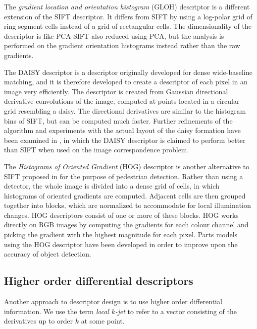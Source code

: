 \documentclass[thesis.tex]{subfiles}
\begin{document}
The \emph{gradient location and orientation histogram} (GLOH) descriptor \cite{mikolajczyk2005performance} is a different extension of the SIFT descriptor. It differs from SIFT by using a log-polar grid of ring segment cells instead of a grid of rectangular cells. The dimensionality of the descriptor is like PCA-SIFT also reduced using PCA, but the analysis is performed on the gradient orientation histograms instead rather than the raw gradients.

The DAISY descriptor \cite{tola2008fast} is a descriptor originally developed for dense wide-baseline matching, and it is therefore developed to create a descriptor of each pixel in an image very efficiently. The descriptor is created from Gaussian directional derivative convolutions of the image, computed at points located in a circular grid resembling a daisy. The directional derivatives are similar to the histogram bins of SIFT, but can be computed much faster. Further refinements of the algorithm and experiments with the actual layout of the daisy formation have been examined in \cite{winder2009picking}, in which the DAISY descriptor is claimed to perform better than SIFT when used on the image correspondence problem.

The \emph{Histograms of Oriented Gradient} (HOG) descriptor is another alternative to SIFT proposed in \cite{dalal2005histograms} for the purpose of pedestrian detection. Rather than using a detector, the whole image is divided into a dense grid of cells, in which histograms of oriented gradients are computed. Adjacent cells are then grouped together into blocks, which are normalized to accommodate for local illumination changes. HOG descriptors consist of one or more of these blocks. HOG works directly on RGB images by computing the gradients for each colour channel and picking the gradient with the highest magnitude for each pixel. Parts models using the HOG descriptor have been developed \cite{felzenszwalb2008discriminatively} in order to improve upon the accuracy of object detection.

\subsection{Higher order differential descriptors}

Another approach to descriptor design is to use higher order differential information. We use the term \emph{local $k$-jet} to refer to a vector consisting of the derivatives up to order $k$ at some point.
\end{document}
